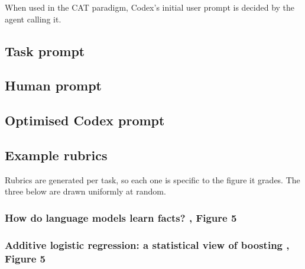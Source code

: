 \documentclass[garamond,a4paper]{inherent}
\begin{document}
When used in the CAT paradigm, Codex's initial user prompt is decided by the agent calling it.

\subsection{Task prompt}
\label{ssec:task-prompt}

\begin{promptcard}

\end{promptcard}

\subsection{Human prompt}
\label{app:human-prompt}

\begin{promptcard}

\end{promptcard}

\subsection{Optimised Codex prompt}
\label{app:optimised-prompt}

\begin{promptcard}

\end{promptcard}

\subsection{Example rubrics}

Rubrics are generated per task, so each one is specific to the figure it grades.
The three below are drawn uniformly at random.

\subsubsection*{How do language models learn facts? \citep{zucchet2025facts}, Figure 5}

\begin{promptcard}

\end{promptcard}

\subsubsection*{Additive logistic regression: a statistical view of boosting \citep{friedman2000additive}, Figure 5}
\end{document}
